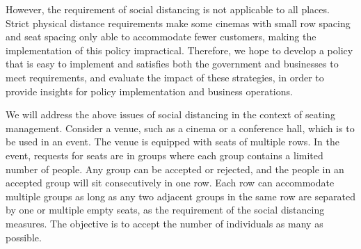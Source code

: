 However, the requirement of social distancing is not applicable to all places. Strict physical distance requirements make some cinemas with small row spacing and seat spacing only able to accommodate fewer customers, making the implementation of this policy impractical. Therefore, we hope to develop a policy that is easy to implement and satisfies both the government and businesses to meet requirements, and evaluate the impact of these strategies, in order to provide insights for policy implementation and business operations.




We will address the above issues of social distancing in the context of seating management. Consider  a venue, such as a cinema or a conference hall, which is to be used in an event. The venue is equipped with seats of multiple rows. In the event, requests for seats are in groups where each group contains a limited number of people. Any group can be accepted or rejected, and the people in an accepted group  will sit consecutively in one row. Each row can accommodate multiple groups as long as any two adjacent groups in the same row are separated by one or multiple empty seats, as the requirement of the social distancing measures. The objective is to accept the number of individuals as many as possible.

